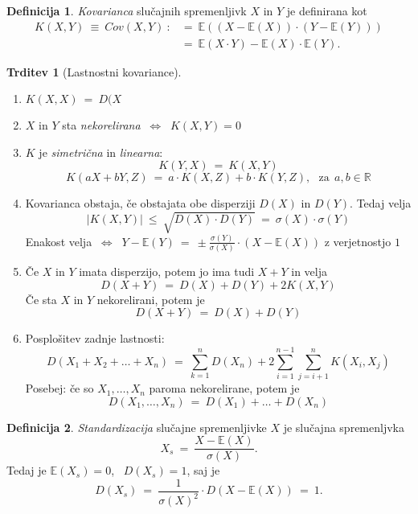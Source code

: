 \documentclass[11pt]{article}
\theoremstyle{definition}
\newtheorem{definicija}{Definicija}[section]
\theoremstyle{definition}
\newtheorem{trditev}{Trditev}[section]
\theoremstyle{definition}
\begin{document}
\vspace{0.5cm}

\begin{definicija}

\textit{Kovarianca} slučajnih spremenljivk $X$ in $Y$ je definirana kot 
\begin{align*}
K(X, Y) ~\equiv~ Cov(X, Y) ~:&=~ \mathbb{E}((X - \mathbb{E}(X)) \cdot (Y - \mathbb{E}(Y))) \\
&=~ \mathbb{E}(X \cdot Y) - \mathbb{E}(X) \cdot \mathbb{E}(Y).
\end{align*}


\end{definicija}
\vspace{0.5cm}

\begin{trditev}[Lastnostni kovariance]
~\\
\begin{enumerate}
	\item $K(X,X) ~=~ D(X$
	\item $X$ in $Y$ sta \textit{nekorelirana} $~\iff~$ $K(X, Y) = 0$
	\item $K$ je \textit{simetrična} in \textit{linearna}:
	$$K(Y, X) ~=~ K(X, Y)$$
	$$K(aX + bY, Z) ~=~ a \cdot K(X, Z) + b \cdot K(Y, Z), ~~~\text{za}~~ a, b \in \mathbb{R}$$
	\item Kovarianca obstaja, če obstajata obe disperziji $D(X)$ in $D(Y)$. Tedaj velja
	$$|K(X,Y)| ~\leq~ \sqrt{D(X) \cdot D(Y)} ~=~ \sigma(X) \cdot \sigma(Y)$$
	Enakost velja $~\iff~$ $Y - \mathbb{E}(Y) ~=~ \pm \frac{\sigma(Y)}{\sigma(X)} \cdot (X - \mathbb{E}(X))$ z verjetnostjo $1$
	\item Če $X$ in $Y$ imata disperzijo, potem jo ima tudi $X+Y$ in velja
	$$D(X+Y) ~=~ D(X) + D(Y) + 2K(X,Y)$$
	Če sta $X$ in $Y$ nekorelirani, potem je
	$$D(X+Y) ~=~ D(X) + D(Y)$$
	\item Posplošitev  zadnje lastnosti:
	$$D(X_1 + X_2 + \ldots + X_n) ~=~ \sum_{k=1}^n D(X_n) + 2\sum_{i=1}^{n-1} \sum_{j=i+1}^n K(X_i, X_j)$$
	Posebej: če so $X_1, \ldots, X_n$ paroma nekorelirane, potem je 
	$$D(X_1, \ldots, X_n) ~=~ D(X_1) + \ldots + D(X_n)$$
\end{enumerate}
\end{trditev}
\vspace{0.5cm}

\begin{definicija}

\textit{Standardizacija} slučajne spremenljivke $X$ je slučajna spremenljvka
$$X_s ~=~ \frac{X - \mathbb{E}(X)}{\sigma(X)}.$$
Tedaj je $\mathbb{E}(X_s) = 0$, ~$D(X_s) = 1$, saj je
$$D(X_s) ~=~ \frac{1}{\sigma(X)^2} \cdot D(X - \mathbb{E}(X)) ~=~ 1.$$

\end{definicija}
\vspace{0.5cm}
\end{document}
